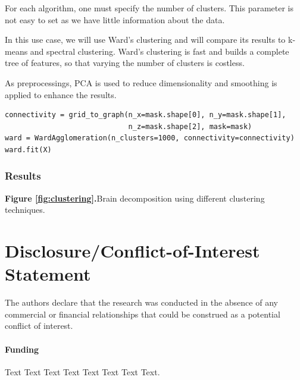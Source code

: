 \documentclass{frontiersSCNS} %
\begin{document}
For each algorithm, one must specify the number of clusters. This parameter is
not easy to set as we have little information about the data.

In this use case, we will use Ward's clustering and will compare its results to
k-means and spectral clustering. Ward's clustering is fast and builds a complete
tree of features, so that varying the number of clusters is costless.

As preprocessings, PCA is used to reduce dimensionality and smoothing is applied
to enhance the results.

\begin{lstlisting}
connectivity = grid_to_graph(n_x=mask.shape[0], n_y=mask.shape[1],
                             n_z=mask.shape[2], mask=mask)
ward = WardAgglomeration(n_clusters=1000, connectivity=connectivity)
ward.fit(X)
\end{lstlisting}

\subsubsection{Results}

\textbf{Figure \ref{fig:clustering}.}{Brain decomposition using different clustering techniques.}\label{fig:04}


\section*{Disclosure/Conflict-of-Interest Statement}
The authors declare that the research was conducted in the absence of any
commercial or financial relationships that could be construed as a potential
conflict of interest.

\paragraph{Funding\textcolon} Text Text Text Text Text Text  Text Text.



\newpage
\end{document}
